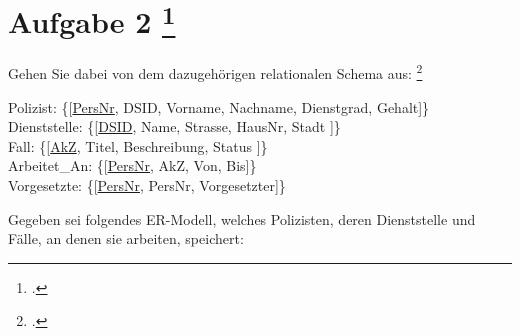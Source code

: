 \documentclass{lehramt-informatik-aufgabe}
\begin{document}
\section{Aufgabe 2
\footcite[Thema 1 Teilaufgabe 1 Aufgabe 2]{examen:66116:2016:03}}

\noindent
Gehen Sie dabei von dem dazugehörigen relationalen Schema aus:
\footcite{db:pu:3}

\bigskip

{
\noindent
\ttfamily
\footnotesize
Polizist: \{[\underline{PersNr}, DSID, Vorname, Nachname, Dienstgrad, Gehalt]\}\\
Dienststelle: \{[\underline{DSID}, Name, Strasse, HausNr, Stadt ]\}\\
Fall: \{[\underline{AkZ}, Titel, Beschreibung, Status ]\}\\
Arbeitet\_An: \{[\underline{PersNr}, AkZ, Von, Bis]\}\\
Vorgesetzte: \{[\underline{PersNr}, PersNr, Vorgesetzter]\}
}

\bigskip

\noindent
Gegeben sei folgendes ER-Modell, welches Polizisten, deren Dienststelle
und Fälle, an denen sie arbeiten, speichert:
\end{document}
